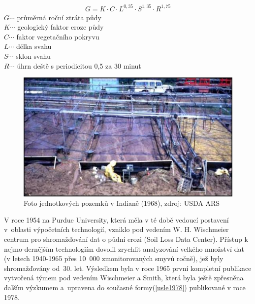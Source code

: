 \begin{align}
   \label{musgrave1947} G=K\cdot C\cdot L^{0,35}\cdot S^{1,35}\cdot R^{1,75}
\end{align}
\hspace*{2cm}$G \cdots$ průměrná roční ztráta půdy\\
\hspace*{2cm}$K \cdots$ geologický faktor eroze půdy \\
\hspace*{2cm}$C \cdots$ faktor vegetačního pokryvu \\
\hspace*{2cm}$L \cdots$ délka svahu \\
\hspace*{2cm}$S \cdots$ sklon svahu \\
\hspace*{2cm}$R \cdots$ úhrn deště s periodicitou 0,5 za 30 minut \\
\begin{figure}[H]
    \centering
    \includegraphics[scale=0.85]{./pictures/unit_plots2.jpg}
      \caption[Foto jednotkových pozemků v Indianě (1968)]{Foto
        jednotkových pozemků v Indianě (1968), zdroj: USDA
        ARS\cite{usda_ars}}
      \label{fig:unit_plots}
\end{figure}
V roce 1954 na Purdue University, která měla v té době vedoucí
postavení v~oblasti výpočetních technologií, vzniklo pod vedením
W. H. Wischmeier centrum pro shromažďování dat o půdní erozi (Soil
Loss Data Center). Přístup k nejmo-dernějším technologiím dovolil
zrychlit analyzování velkého množství dat (v letech 1940-1965 přes
10~000 zmonitorovaných smyvů ročně), jež byly shromažďovány od~30. let. Výsledkem byla v roce 1965 první kompletní publikace
vytvořená týmem pod vedením Wischmeier a Smith, která byla ještě
zpřesněna dalším výzkumem a~upravena do současné formy(\ref{usle1978})
publikované v roce 1978.\cite{usle1978}

